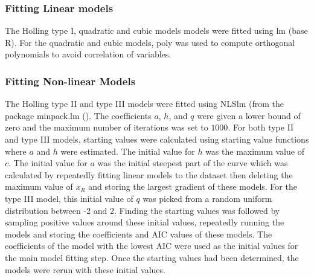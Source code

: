 \documentclass{article}
\begin{document}
\subsubsection{Fitting Linear models}
 The Holling type I, quadratic and cubic models models were fitted using lm (base R). For the quadratic and cubic models, poly was used to compute orthogonal polynomials to avoid correlation of variables.
\subsubsection{Fitting Non-linear Models}
The Holling type II and type III models were fitted using NLSlm (from the package minpack.lm (\cite{Elzhov2016}). The coefficients $a$, $h$, and $q$ were given a lower bound of zero and the maximum number of iterations was set to $1000$. For both type II and type III models, starting values were calculated using starting value functions where $a$ and $h$ were estimated. The initial value for $h$ was the maximum value of $c$. The initial value for $a$ was the initial steepest part of the curve which was calculated by repeatedly fitting linear models to the dataset then deleting the maximum value of $x_R$ and storing the largest gradient of these models. For the type III model, this initial value of $q$ was picked from a random uniform distribution between -2 and 2. Finding the starting values was followed by sampling positive values around these initial values, repeatedly running the models and storing the coefficients and AIC values of these models. The coefficients of the model with the lowest AIC were used as the initial values for the main model fitting step. Once the starting values had been determined, the models were rerun with these initial values. 
\end{document}
